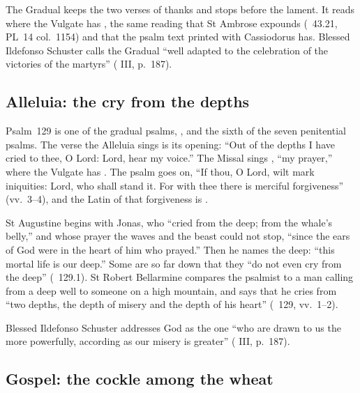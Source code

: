 The Gradual keeps the two verses of thanks and stops before the lament. It
reads  where the Vulgate has
, the same reading that St
Ambrose expounds (\ 43.21, PL~14 col.~1154) and that
the psalm text printed with Cassiodorus has. Blessed Ildefonso Schuster calls the Gradual
``well adapted to the celebration of the victories of the martyrs''
( III, p.~187).

\subsection{Alleluia: the cry from the depths}
\label{sec:element-alleluia}

Psalm~129 is one of the gradual psalms, , and the
sixth of the seven penitential psalms. The verse the Alleluia sings is its
opening: ``Out of the depths I have cried to thee, O Lord: Lord, hear my
voice.'' The Missal sings , ``my prayer,'' where the
Vulgate has . The psalm goes on, ``If thou, O Lord, wilt
mark iniquities: Lord, who shall stand it. For with thee there is merciful
forgiveness'' (vv.~3--4), and the Latin of that forgiveness is
.

St Augustine begins with Jonas, who ``cried from the deep; from the whale's
belly,'' and whose prayer the waves and the beast could not stop, ``since the
ears of God were in the heart of him who prayed.'' Then he names the deep:
``this mortal life is our deep.'' Some are so far down that they ``do not even
cry from the deep'' (\ 129.1). St Robert Bellarmine
compares the psalmist to a man calling from a deep well to someone on a high
mountain, and says that he cries from ``two depths, the depth of misery and
the depth of his heart'' (\ 129, vv.~1--2).

Blessed Ildefonso Schuster addresses God as the one ``who are drawn to us the
more powerfully, according as our misery is greater'' ( III, p.~187).

\subsection{Gospel: the cockle among the wheat}
\label{sec:element-gospel}

